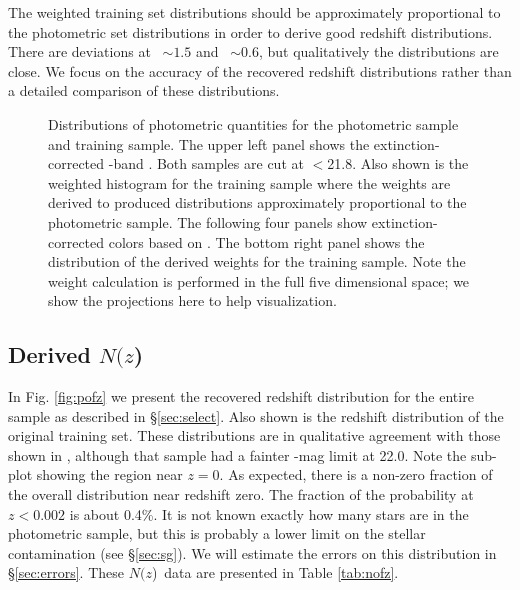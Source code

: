 \documentclass[12pt,preprint]{aastex}
\newcommand{\rmax}{21.8}
\newcommand{\nofz}{$N(z$)}
\begin{document}
The weighted training set distributions should be approximately proportional to
the photometric set distributions in order to derive good redshift
distributions.  There are deviations at \gmr\ $\sim 1.5$ and \rmi\ $\sim 0.6$,
but qualitatively the distributions are close.  We focus on the accuracy of the
recovered redshift distributions rather than a detailed comparison of these
distributions.

\begin{figure}[p] \centering

    \caption{Distributions of photometric quantities for the photometric sample
    and training sample.  The upper left panel shows the extinction-corrected
    \rmag-band \cmodelmag.  Both samples are cut at \rmag$ < $\rmax.  Also
    shown is the weighted histogram for the training sample where the weights
    are derived to produced distributions approximately proportional to the
    photometric sample.  The following four panels show extinction-corrected
    colors based on \modelmag.  The bottom right panel shows the distribution
    of the derived weights for the training sample. Note the weight
    calculation is performed in the full five dimensional space; we show
    the projections here to help visualization.} \label{fig:varhist}

    \vspace{2em}
\end{figure}

\subsection{Derived \nofz}

In Fig. \ref{fig:pofz} we present the recovered redshift distribution for the
entire sample as described in \S \ref{sec:select}.  Also shown is the redshift
distribution of the original training set.  These distributions are in
qualitative agreement with those shown in \citet{CunhaPhotoz09}, although that
sample had a fainter \rmag-mag limit at 22.0.  Note the sub-plot showing the
region near $z=0$.  As expected, there is a non-zero fraction of the overall
distribution near redshift zero.  The fraction of the probability at $z <
0.002$ is about 0.4\%.  It is not known exactly how many stars are in the
photometric sample, but this is probably a lower limit on the stellar
contamination (see \S \ref{sec:sg}).  We will estimate the errors on this
distribution in \S \ref{sec:errors}. These \nofz\ data are presented in Table
\ref{tab:nofz}.
\end{document}
